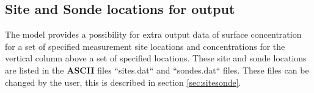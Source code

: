 \subsection{Site and Sonde locations for output}\label{sec:sitessondes_input}
The model provides a possibility for extra output data of surface concentration 
for a set of specified measurement site locations and concentrations for the vertical 
column above a set of specified locations. These site and sonde locations are listed 
in the {\bf ASCII} files ``sites.dat`` and ``sondes.dat`` files. These files can be 
changed by the user, this is described in section \ref{sec:sitesonde}.

